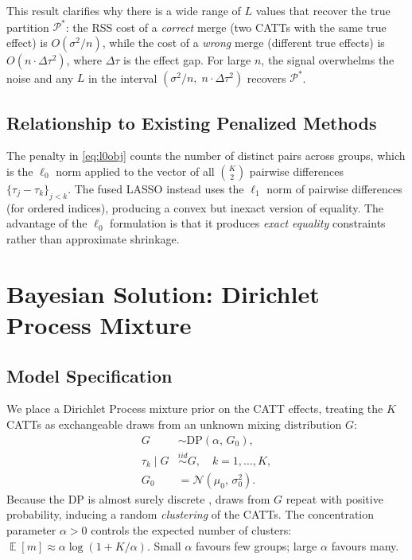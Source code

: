 \documentclass[margin=3in, 12pt]{article}
\DeclareMathOperator{\E}{\mathbb{E}}
\newcommand{\DP}{\mathrm{DP}}
\newcommand{\Normal}{\mathcal{N}}
\newcommand{\1}{\mathbbm{1}}
\begin{document}
This result clarifies why there is a wide range of $L$ values that recover
the true partition $\mathcal{P}^*$: the RSS cost of a \emph{correct} merge
(two CATTs with the same true effect) is $O(\sigma^2/n)$, while the cost
of a \emph{wrong} merge (different true effects) is $O(n \cdot \Delta\tau^2)$,
where $\Delta\tau$ is the effect gap. For large $n$, the signal
overwhelms the noise and any $L$ in the interval
$(\sigma^2/n,\; n \cdot \Delta\tau^2)$ recovers $\mathcal{P}^*$.

\subsection{Relationship to Existing Penalized Methods}

The penalty in \eqref{eq:l0obj} counts the number of distinct pairs across
groups, which is the $\ell_0$ norm applied to the vector of all
$\binom{K}{2}$ pairwise differences $\{\tau_j - \tau_k\}_{j < k}$. The
fused LASSO \citep{tibshirani2005} instead uses the $\ell_1$ norm of pairwise
differences (for ordered indices), producing a convex but inexact version of
equality. The advantage of the $\ell_0$ formulation is that it produces
\emph{exact equality} constraints rather than approximate shrinkage.

\section{Bayesian Solution: Dirichlet Process Mixture}
\label{sec:bayes}

\subsection{Model Specification}

We place a Dirichlet Process mixture prior on the CATT effects, treating the
$K$ CATTs as exchangeable draws from an unknown mixing distribution $G$:
\begin{align}
  G &\sim \DP(\alpha,\, G_0), \label{eq:dp_prior}\\
  \tau_k \mid G &\overset{iid}{\sim} G, \quad k = 1,\ldots,K,
  \label{eq:dp_draw}\\
  G_0 &= \Normal(\mu_0,\, \sigma_0^2).
  \label{eq:base}
\end{align}
Because the DP is almost surely discrete \citep{ferguson1973}, draws
from $G$ repeat with positive probability, inducing a random
\emph{clustering} of the CATTs. The concentration parameter $\alpha > 0$
controls the expected number of clusters: $\E[m] \approx \alpha\log(1+K/\alpha)$.
Small $\alpha$ favours few groups; large $\alpha$ favours many.
\end{document}
